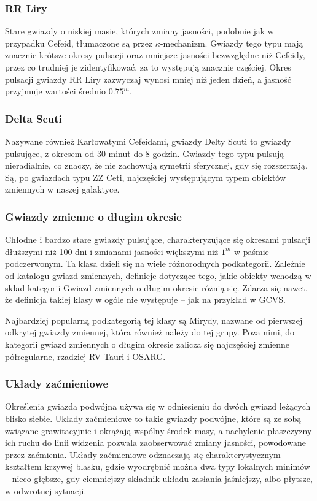 \documentclass{pracalicmgr}
\begin{document}
    \subsubsection{RR Liry}
    Stare gwiazdy o niskiej masie, których zmiany jasności, podobnie jak w przypadku Cefeid, tłumaczone są przez $\kappa$-mechanizm. Gwiazdy tego typu mają znacznie krótsze okresy pulsacji oraz mniejsze jasności bezwzględne niż Cefeidy, przez co trudniej je zidentyfikować, za to występują znacznie częściej. Okres pulsacji gwiazdy RR Liry zazwyczaj wynosi mniej niż jeden dzień, a jasność przyjmuje wartości średnio $0.75^m$.  
    \subsubsection{Delta Scuti}
    Nazywane również Karłowatymi Cefeidami, gwiazdy Delty Scuti to gwiazdy pulsujące, z okresem od 30 minut do 8 godzin. Gwiazdy tego typu pulsują nieradialnie, co znaczy, że nie zachowują symetrii sferycznej, gdy się rozszerzają. Są, po gwiazdach typu ZZ Ceti, najczęściej występującym typem obiektów zmiennych w naszej galaktyce.
    \subsubsection{Gwiazdy zmienne o długim okresie}
    Chłodne i bardzo stare gwiazdy pulsujące, charakteryzujące się okresami pulsacji dłuższymi niż 100 dni i zmianami jasności większymi niż $1^m$ w paśmie podczerwonym. Ta klasa dzieli się na wiele różnorodnych podkategorii. Zależnie od katalogu gwiazd zmiennych, definicje dotyczące tego, jakie obiekty wchodzą w skład kategorii Gwiazd zmiennych o długim okresie różnią się. Zdarza się nawet, że definicja takiej klasy w ogóle nie występuje -- jak na przykład w GCVS. 
    
    Najbardziej popularną podkategorią tej klasy są Mirydy, nazwane od pierwszej odkrytej gwiazdy zmiennej, która również należy do tej grupy. Poza nimi, do kategorii gwiazd zmiennych o długim okresie zalicza się najczęściej zmienne półregularne, rzadziej RV Tauri i OSARG.
    \subsubsection{Układy zaćmieniowe}
    Określenia gwiazda podwójna używa się w odniesieniu do dwóch gwiazd leżących blisko siebie. Układy zaćmieniowe to takie gwiazdy podwójne, które są ze sobą związane grawitacyjnie i okrążają wspólny środek masy, a nachylenie płaszczyzny ich ruchu do linii widzenia pozwala zaobserwować zmiany jasności, powodowane przez zaćmienia. Układy zaćmieniowe odznaczają się charakterystycznym kształtem krzywej blasku, gdzie wyodrębnić można dwa typy lokalnych minimów -- nieco głębsze, gdy ciemniejszy składnik układu zasłania jaśniejszy, albo płytsze, w odwrotnej sytuacji. 
\end{document}
